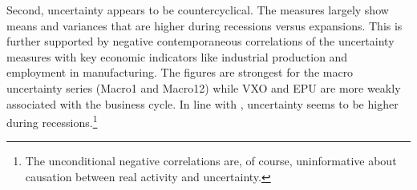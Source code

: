 \documentclass[a4paper,11pt,listof=nochaptergap,oneside,pointednumbers,bibtotoc,bigheadings,liststotoc]{scrbook}
\theoremstyle{mysatz}
\theoremstyle{mydefinition}
\theoremstyle{mytheorem}
\theoremstyle{mybemerkung}
\begin{document}
Second, uncertainty appears to be countercyclical. The measures largely show means and variances that are higher during recessions versus expansions. This is further supported by negative contemporaneous correlations of the uncertainty measures with key economic indicators like industrial production and employment in manufacturing. The figures are strongest for the macro uncertainty series (Macro1 and Macro12) while VXO and EPU are more weakly associated with the business cycle. In line with \citet{bloom:14}, uncertainty seems to be higher during recessions.\footnote{The unconditional negative correlations are, of course, uninformative about causation between real activity and uncertainty.}

\begin{table}[!h]
\tiny
\centering
\caption[Summary Statistics on the Dynamics of Uncertainty Proxies.]{Summary Statistics on the Dynamics of Uncertainty Proxies.\\
\textit{Note:} IP-corr(k) and EMP-corr(k) are the absolute cross-correlation coefficients between a measure of uncertainty and the 12 month moving average of industrial production or employment in manufacturing growth in period $t+k$, i.e., $\text{IP-corr(k)} = |corr(u_t, \Delta \% IP_{t+k}|$ and $\text{EMP-corr(k)} = |corr(u_t, \Delta \% EMP_{t+k}|$. A positive $k$ means uncertainty is correlated with future IP/EMP. Half-lifes are based on estimates from a univariate AR(1) model for each series and calculated as $HL = ln(2)/ln(AR(1).coef)$. The sample for each uncertainty measure is the largest available, starting in July 1962 in the case of VXO, EPU, Macro1 and Macro12.}
\end{table}
\end{document}
